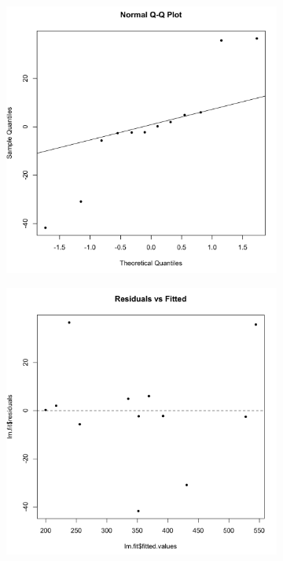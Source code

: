 \documentclass[11pt]{article}
\begin{document}
\begin{figure}[H]
    \centering
    \begin{subfigure}{0.45\textwidth}
        \includegraphics[width=\textwidth]{../pictures/hw3_q1_1_qq.png}
    \end{subfigure}
    \begin{subfigure}{0.45\textwidth}
        \includegraphics[width=\textwidth]{../pictures/hw3_q1_1_nf.png}
    \end{subfigure}
\end{figure}
\end{document}
